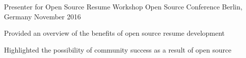 

\begin{cventries}

  \cventry
    {Presenter for Open Source Resume Workshop} %
    {Open Source Conference} %
    {Berlin, Germany} %
    {November 2016} %
    {
      \begin{cvitems} %
        \item {Provided an overview of the benefits of open source resume development}
        \item {Highlighted the possibility of community success as a result of open source}
      \end{cvitems}
    }

\end{cventries}
